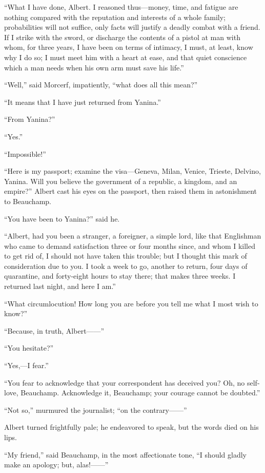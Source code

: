 “What I have done, Albert. I reasoned thus—money, time, and fatigue are
nothing compared with the reputation and interests of a whole family;
probabilities will not suffice, only facts will justify a deadly combat
with a friend. If I strike with the sword, or discharge the contents of
a pistol at man with whom, for three years, I have been on terms of
intimacy, I must, at least, know why I do so; I must meet him with a
heart at ease, and that quiet conscience which a man needs when his own
arm must save his life.”

“Well,” said Morcerf, impatiently, “what does all this mean?”

“It means that I have just returned from Yanina.”

“From Yanina?”

“Yes.”

“Impossible!”

“Here is my passport; examine the visa—Geneva, Milan, Venice, Trieste,
Delvino, Yanina. Will you believe the government of a republic, a
kingdom, and an empire?” Albert cast his eyes on the passport, then
raised them in astonishment to Beauchamp.

“You have been to Yanina?” said he.

“Albert, had you been a stranger, a foreigner, a simple lord, like that
Englishman who came to demand satisfaction three or four months since,
and whom I killed to get rid of, I should not have taken this trouble;
but I thought this mark of consideration due to you. I took a week to
go, another to return, four days of quarantine, and forty-eight hours
to stay there; that makes three weeks. I returned last night, and here
I am.”

“What circumlocution! How long you are before you tell me what I most
wish to know?”

“Because, in truth, Albert——”

“You hesitate?”

“Yes,—I fear.”

“You fear to acknowledge that your correspondent has deceived you? Oh,
no self-love, Beauchamp. Acknowledge it, Beauchamp; your courage cannot
be doubted.”

“Not so,” murmured the journalist; “on the contrary——”

Albert turned frightfully pale; he endeavored to speak, but the words
died on his lips.

“My friend,” said Beauchamp, in the most affectionate tone, “I should
gladly make an apology; but, alas!——”

